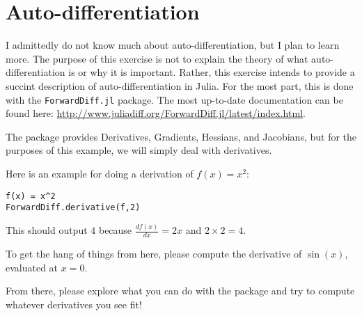 \documentclass[11pt]{article}
\begin{document}
\newpage
\section*{Auto-differentiation}

I admittedly do not know much about auto-differentiation, but I plan to learn more. The purpose of this exercise is not to explain the theory of what auto-differentiation is or why it is important. Rather, this exercise intends to provide a succint description of auto-differentiation in Julia. For the most part, this is done with the \texttt{ForwardDiff.jl} package. The most up-to-date documentation can be found here: \url{http://www.juliadiff.org/ForwardDiff.jl/latest/index.html}.

The package provides Derivatives, Gradients, Hessians, and Jacobians, but for the purposes of this example, we will simply deal with derivatives.

Here is an example for doing a derivation of $f(x) = x^2$:

\begin{lstlisting}
f(x) = x^2
ForwardDiff.derivative(f,2)
\end{lstlisting}

This should output $4$ because $\frac{df(x)}{dx} = 2x$ and $2\times2 = 4$.

\vspace{1cm}

To get the hang of things from here, please compute the derivative of $\sin(x)$, evaluated at $x = 0$.

\vspace{1cm}

From there, please explore what you can do with the package and try to compute whatever derivatives you see fit!
\end{document}
